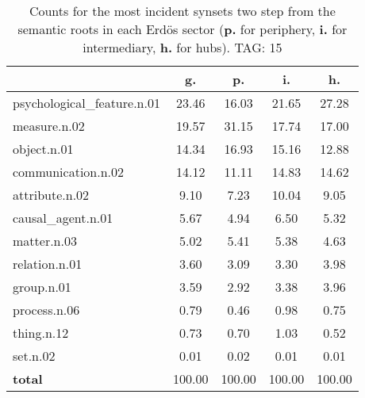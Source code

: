 \begin{table}[h!]
\begin{center}
\begin{tabular}{| l || c | c | c | c |}\hline
 & {\bf g.} & {\bf p.} & {\bf i.} & {\bf h.} \\\hline\hline
psychological\_feature.n.01 & 23.46  & 16.03  & 21.65  & 27.28 \\\hline
measure.n.02 & 19.57  & 31.15  & 17.74  & 17.00 \\\hline
object.n.01 & 14.34  & 16.93  & 15.16  & 12.88 \\\hline
communication.n.02 & 14.12  & 11.11  & 14.83  & 14.62 \\\hline
attribute.n.02 & 9.10  & 7.23  & 10.04  & 9.05 \\\hline
causal\_agent.n.01 & 5.67  & 4.94  & 6.50  & 5.32 \\\hline
matter.n.03 & 5.02  & 5.41  & 5.38  & 4.63 \\\hline
relation.n.01 & 3.60  & 3.09  & 3.30  & 3.98 \\\hline
group.n.01 & 3.59  & 2.92  & 3.38  & 3.96 \\\hline
process.n.06 & 0.79  & 0.46  & 0.98  & 0.75 \\\hline
thing.n.12 & 0.73  & 0.70  & 1.03  & 0.52 \\\hline
set.n.02 & 0.01  & 0.02  & 0.01  & 0.01 \\\hline\hline
{{\bf total}} & 100.00  & 100.00  & 100.00  & 100.00 \\\hline
\end{tabular}
\caption{Counts for the most incident synsets two step from the semantic roots in each Erd\"os sector ({\bf p.} for periphery, {\bf i.} for intermediary, {\bf h.} for hubs). TAG: 15}
\end{center}
\end{table}